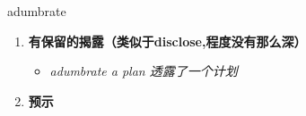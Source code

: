 
\begin{frame}
{\huge adumbrate}
\begin{center}
\begin{enumerate}\Large
  \item \textbf{有保留的揭露（类似于disclose,程度没有那么深）}
  \begin{itemize}
    \item \em{\Large{adumbrate a plan 透露了一个计划}}
  \end{itemize}
  \item \textbf{预示}
\end{enumerate}
\end{center}
\end{frame}
